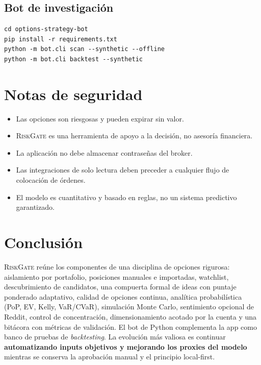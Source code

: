 \documentclass[11pt,letterpaper]{article}
\newcommand{\RiskGate}{\textsc{RiskGate}}
\begin{document}
\subsection{Bot de investigación}
\begin{lstlisting}
cd options-strategy-bot
pip install -r requirements.txt
python -m bot.cli scan --synthetic --offline
python -m bot.cli backtest --synthetic
\end{lstlisting}

\section{Notas de seguridad}

\begin{itemize}[noitemsep]
  \item Las opciones son riesgosas y pueden expirar sin valor.
  \item \RiskGate{} es una herramienta de apoyo a la decisión, no asesoría
        financiera.
  \item La aplicación no debe almacenar contraseñas del broker.
  \item Las integraciones de solo lectura deben preceder a cualquier flujo de
        colocación de órdenes.
  \item El modelo es cuantitativo y basado en reglas, no un sistema predictivo
        garantizado.
\end{itemize}

\section{Conclusión}

\RiskGate{} reúne los componentes de una disciplina de opciones rigurosa:
aislamiento por portafolio, posiciones manuales e importadas, watchlist,
descubrimiento de candidatos, una compuerta formal de ideas con puntaje
ponderado adaptativo, calidad de opciones continua, analítica probabilística
(PoP, EV, Kelly, VaR/CVaR), simulación Monte Carlo, sentimiento opcional de
Reddit, control de concentración, dimensionamiento acotado por la cuenta y una
bitácora con métricas de validación. El bot de Python complementa la app como
banco de pruebas de \emph{backtesting}. La evolución más valiosa es continuar
\textbf{automatizando inputs objetivos y mejorando los proxies del modelo}
mientras se conserva la aprobación manual y el principio local-first.
\end{document}
